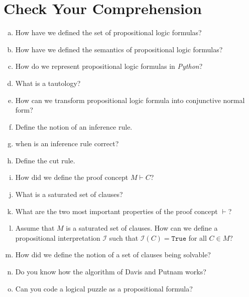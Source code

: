 \pagebreak
\hspace*{\fill}

\pagebreak

\section{Check Your Comprehension}
\begin{enumerate}[(a)]
\item How have we defined the set of propositional logic formulas?
\item How have we defined the semantics of propositional logic formulas?
\item How do we represent propositional logic formulas in \textsl{Python}?
\item What is a tautology?
\item How can we transform propositional logic formula into conjunctive normal
      form?
\item Define the notion of an inference rule.
\item when is  an inference rule correct?
\item Define the cut rule.
\item How did we define the proof concept $M \vdash C$?
\item What is a saturated set of clauses?
\item What are the two most important properties of the proof concept $\vdash$?
\item Assume that $M$ is a saturated set of clauses. How can we define a propositional interpretation
      $\mathcal{I}$ such that $\mathcal{I}(C) = \mathtt{True}$ for all $C \in M$?
\item How did we define the notion of a set of clauses being solvable?
\item Do you know how the algorithm of Davis and Putnam works?
\item Can you code a logical puzzle as a propositional formula?
\end{enumerate}


%

